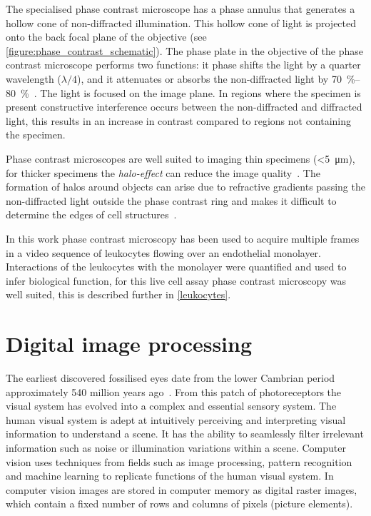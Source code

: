 The specialised phase contrast microscope has a phase annulus that generates a hollow cone of non-diffracted illumination. This hollow cone of light is projected onto the back focal plane of the objective (see \autoref{figure:phase_contrast_schematic}). The phase plate in the objective of the phase contrast microscope performs two functions: it phase shifts the light by a quarter wavelength ($\lambda/4$), and it attenuates or absorbs the non-diffracted light by \SIrange{70}{80}{\percent}~\cite{Spector2006}. The light is focused on the image plane. In regions where the specimen is present constructive interference occurs between the non-diffracted and diffracted light, this results in an increase in contrast compared to regions not containing the specimen.

Phase contrast microscopes are well suited to imaging thin specimens (\textless \SI{5}{\micro\meter}), for thicker specimens the \emph{halo-effect} can reduce the image quality~\cite{Spector2006}. The formation of halos around objects can arise due to refractive gradients passing the non-diffracted light outside the phase contrast ring and makes it difficult to determine the edges of cell structures~\cite{Otaki2000}.

In this work phase contrast microscopy has been used to acquire multiple frames in a video sequence of leukocytes flowing over an endothelial monolayer. Interactions of the leukocytes with the monolayer were quantified and used to infer biological function, for this live cell assay phase contrast microscopy was well suited, this is described further in \autoref{leukocytes}.

\section{Digital image processing}
\label{introduction:image_processing}
The earliest discovered fossilised eyes date from the lower Cambrian period approximately 540 million years ago~\cite{Parker2011}. From this patch of photoreceptors the visual system has evolved into a complex and essential sensory system. The human visual system is adept at intuitively perceiving and interpreting visual information to understand a scene. It has the ability to seamlessly filter irrelevant information such as noise or illumination variations within a scene. Computer vision uses techniques from fields such as image processing, pattern recognition and machine learning to replicate functions of the human visual system. In computer vision images are stored in computer memory as digital raster images, which contain a fixed number of rows and columns of pixels (picture elements).

